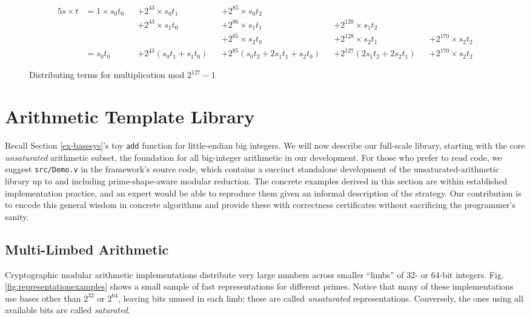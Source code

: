 \documentclass[conference,letterpaper]{IEEEtran}
\newcommand{\id}[1]{\bm{\mathsf{#1}}}
\begin{document}
\begin{figure*}
\begin{alignat*}{5}
    s \times t & = 1 \times s_0t_0 && + 2^{43} \times s_0t_1 && + 2^{85} \times s_0t_2 \\
    & && + 2^{43} \times s_1t_0 && + 2^{86} \times s_1t_1 && + 2^{128} \times s_1t_2 \\
    & && && + 2^{85} \times s_2t_0 && + 2^{128} \times s_2t_1 && + 2^{170} \times s_2t_2 \\
    & = s_0t_0 && + 2^{43}(s_0t_1 + s_1t_0) && + 2^{85}(s_0t_2 + 2s_1t_1 + s_2t_0) && + 2^{127}(2s_1t_2 + 2s_2t_1) && + 2^{170}\times s_2t_2
\end{alignat*}
\caption{\label{distribute}Distributing terms for multiplication mod $2^{127}-1$}
\end{figure*}

\section{Arithmetic Template Library}\label{basesystems}

Recall Section \ref{ex-basesys}'s toy $\id{add}$ function for little-endian big integers.
We will now describe our full-scale library, starting with the core \emph{unsaturated} arithmetic subset, the foundation for all big-integer arithmetic in our development.
For those who prefer to read code, we suggest \texttt{src/Demo.v} in the framework's source code, which contains a succinct standalone development of the unsaturated-arithmetic library up to and including prime-shape-aware modular reduction.
The concrete examples derived in this section are within established implementation practice, and an expert would be able to reproduce them given an informal description of the strategy.
Our contribution is to encode this general wisdom in concrete algorithms and provide these with correctness certificates without sacrificing the programmer's sanity.

\subsection{Multi-Limbed Arithmetic}\label{unsaturated}

Cryptographic modular arithmetic implementations distribute very large numbers across smaller ``limbs'' of 32- or 64-bit integers.
Fig. \ref{fig:representationexamples} shows a small sample of fast representations for different primes.
Notice that many of these implementations use bases other than $2^{32}$ or $2^{64}$, leaving bits unused in each limb: these are called \emph{unsaturated} representations.
Conversely, the ones using all available bits are called \emph{saturated}.
\end{document}
